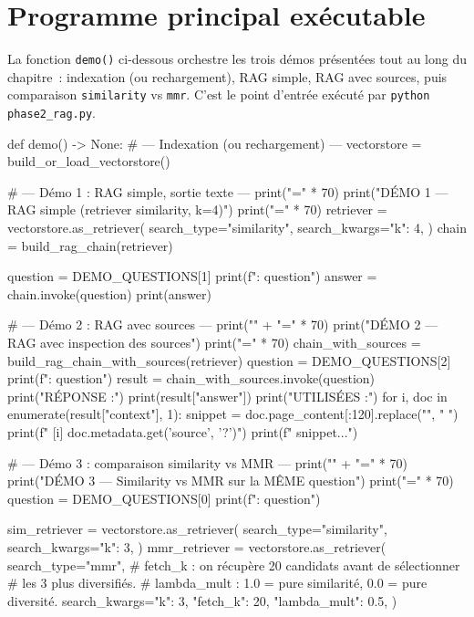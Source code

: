 \documentclass[11pt,a4paper]{article}
\begin{document}
\appendix

\section{Programme principal exécutable}

La fonction \texttt{demo()} ci-dessous orchestre les trois démos
présentées tout au long du chapitre~: indexation (ou rechargement),
RAG simple, RAG avec sources, puis comparaison \texttt{similarity} vs
\texttt{mmr}. C'est le point d'entrée exécuté par
\texttt{python phase2\_rag.py}.

\begin{pythoncode}
def demo() -> None:
    # --- Indexation (ou rechargement) ---
    vectorstore = build_or_load_vectorstore()

    # --- Démo 1 : RAG simple, sortie texte ---
    print("=" * 70)
    print("DÉMO 1 — RAG simple (retriever similarity, k=4)")
    print("=" * 70)
    retriever = vectorstore.as_retriever(
        search_type="similarity",
        search_kwargs={"k": 4},
    )
    chain = build_rag_chain(retriever)

    question = DEMO_QUESTIONS[1]
    print(f"\nQuestion : {question}\n")
    answer = chain.invoke(question)
    print(answer)

    # --- Démo 2 : RAG avec sources ---
    print("\n" + "=" * 70)
    print("DÉMO 2 — RAG avec inspection des sources")
    print("=" * 70)
    chain_with_sources = build_rag_chain_with_sources(retriever)
    question = DEMO_QUESTIONS[2]
    print(f"\nQuestion : {question}\n")
    result = chain_with_sources.invoke(question)
    print("RÉPONSE :")
    print(result["answer"])
    print("\nSOURCES UTILISÉES :")
    for i, doc in enumerate(result["context"], 1):
        snippet = doc.page_content[:120].replace("\n", " ")
        print(f"  [{i}] {doc.metadata.get('source', '?')}")
        print(f"      {snippet}...")

    # --- Démo 3 : comparaison similarity vs MMR ---
    print("\n" + "=" * 70)
    print("DÉMO 3 — Similarity vs MMR sur la MÊME question")
    print("=" * 70)
    question = DEMO_QUESTIONS[0]
    print(f"\nQuestion : {question}")

    sim_retriever = vectorstore.as_retriever(
        search_type="similarity",
        search_kwargs={"k": 3},
    )
    mmr_retriever = vectorstore.as_retriever(
        search_type="mmr",
        # fetch_k : on récupère 20 candidats avant de sélectionner
        # les 3 plus diversifiés.
        # lambda_mult : 1.0 = pure similarité, 0.0 = pure diversité.
        search_kwargs={"k": 3, "fetch_k": 20, "lambda_mult": 0.5},
    )


\end{pythoncode}
\end{document}
